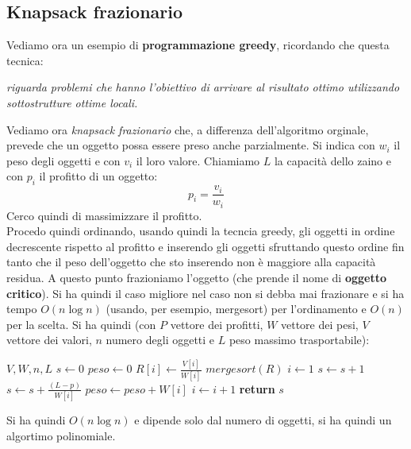 \documentclass[a4paper,12pt, oneside]{book}
\begin{document}
\subsection{Knapsack frazionario}
Vediamo ora un esempio di \textbf{programmazione greedy}, ricordando
che questa tecnica:
\begin{algorithm}
  \textit{riguarda problemi che hanno l’obiettivo di arrivare al
    risultato ottimo utilizzando sottostrutture ottime locali.}
\end{algorithm}
Vediamo ora \textit{knapsack frazionario} che, a differenza
dell'algoritmo orginale, prevede che un oggetto possa essere preso
anche parzialmente. Si indica con $w_i$ il peso degli oggetti e con
$v_i$ il loro valore. Chiamiamo $L$ la capacità dello zaino e con
$p_i$ il profitto di un oggetto:
\[p_i=\frac{v_i}{w_i}\]
Cerco quindi di massimizzare il profitto.\\
Procedo quindi ordinando, usando quindi la tecncia greedy, gli oggetti
in ordine decrescente rispetto al profitto e inserendo gli oggetti
sfruttando questo ordine fin tanto che il peso dell'oggetto che sto
inserendo non è maggiore alla capacità residua. A questo punto
frazioniamo l'oggetto (che prende il nome di \textbf{oggetto
  critico}). Si ha quindi il caso migliore nel caso non si debba mai
frazionare e si ha tempo $O(n\log n)$ (usando, per esempio, mergesort)
per l'ordinamento e $O(n)$ per la scelta. Si ha quindi (con $P$
vettore dei profitti, $W$ vettore dei pesi, $V$ vettore dei valori,
$n$ numero degli oggetti e $L$ peso massimo trasportabile):
\begin{algorithm}
  \begin{algorithmic}
     {$V,W,n,L$}
    \State $s\gets 0$
    \State $peso\gets 0$
    \State
    \State $R[i]\gets \frac{V[i]}{W[i]}$
    \EndFor
    \State $mergesort(R)$
    \State $i\gets 1$
    \State $s\gets s+1$
    \Else
    \State $s\gets s+\frac{(L-p)}{W[i]}$
    \EndIf
    \State $peso\gets peso+W[i]$
    \State $i\gets i+1$
    \EndWhile
    \State \textbf{return} $s$
    \EndFunction
  \end{algorithmic}
\end{algorithm}
Si ha quindi $O(n\log n)$ e dipende solo dal numero di oggetti, si ha
quindi un algortimo polinomiale.
\end{document}
